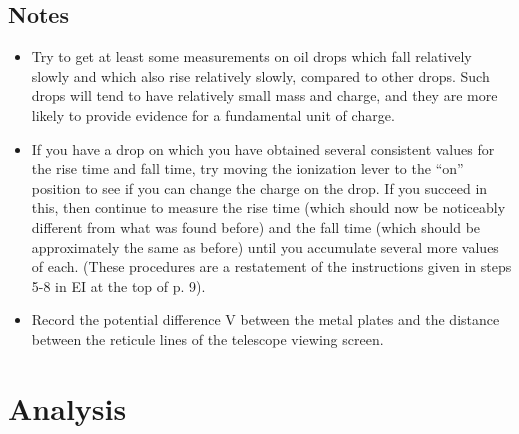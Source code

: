 \subsection{Notes}
\label{secnotes}

\begin{itemize}
\item Try to get at least some measurements on oil drops which fall
relatively slowly and which also rise relatively slowly, compared to
other drops.  Such drops will tend to have relatively small mass and
charge, and they are more likely to provide evidence for a fundamental
unit of charge.


\item If you have a drop on which you have obtained several consistent
values for the rise time and fall time, try moving the ionization lever
to the ``on'' position to see if you can
change the charge on the drop.  If you succeed in this, then continue
to measure the rise time (which should now be noticeably different from
what was found before) and the fall time (which should be approximately
the same as before) until you accumulate several more values of each.
 (These procedures are a restatement of the instructions given in
steps 5-8 in EI at the top of p. 9).

\item Record the potential difference V between the metal plates and the
distance between the reticule lines of the telescope viewing screen.
\end{itemize}

\section{Analysis}


